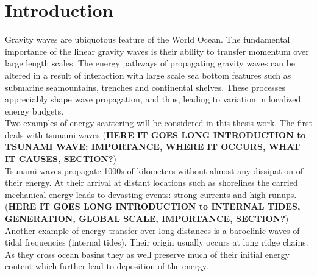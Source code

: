 \section{Introduction}
Gravity waves are ubiquotous feature of the World Ocean. The fundamental importance of the linear gravity waves is their ability to transfer momentum over large length scales. The energy pathways of propagating gravity waves can be altered in a result of interaction with large scale sea bottom features such as submarine seamountains, trenches and continental shelves. These processes appreciably shape wave propagation, and thus, leading to variation in localized energy budgets.\\
Two examples of energy scattering will be considered in this thesis work. The first deals with tsunami waves (\textbf{HERE IT GOES LONG INTRODUCTION to TSUNAMI WAVE: IMPORTANCE, WHERE IT OCCURS, WHAT IT CAUSES, SECTION?})\\
Tsunami waves propagate 1000s of kilometers without almost any dissipation of their energy. At their arrival at distant locations such as shorelines the carried mechanical energy leads to devasting events: strong currents and high runups.\\
(\textbf{HERE IT GOES LONG INTRODUCTION to INTERNAL TIDES, GENERATION, GLOBAL SCALE, IMPORTANCE, SECTION?})\\
Another example of energy transfer over long distances is a baroclinic waves of tidal frequencies (internal tides). Their origin usually occurs at long ridge chains. As they cross ocean basins they as well preserve much of their initial energy content which further lead to deposition of the energy.\\





